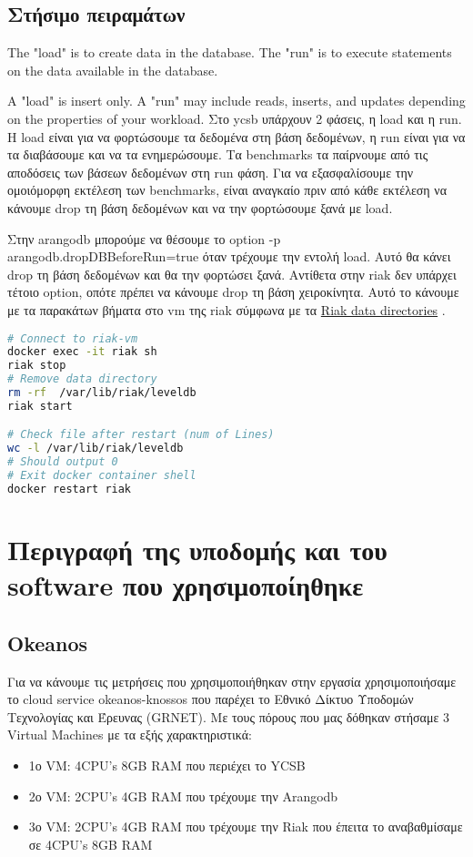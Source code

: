 \documentclass[conference]{IEEEtran}
\begin{document}
\subsection{Στήσιμο πειραμάτων}
The "load" is to create data in the database. The "run" is to execute statements on the data available in the database.

A "load" is insert only. A "run" may include reads, inserts, and updates depending on the properties of your workload.
Στο ycsb υπάρχουν 2 φάσεις, η load και η run. Η load είναι για να φορτώσουμε τα 
δεδομένα στη βάση δεδομένων, η run είναι για να τα διαβάσουμε και να τα 
ενημερώσουμε. Τα benchmarks τα παίρνουμε από τις αποδόσεις των βάσεων δεδομένων
στη run φάση.
Για να εξασφαλίσουμε την ομοιόμορφη εκτέλεση των benchmarks, είναι αναγκαίο πριν 
από κάθε εκτέλεση να κάνουμε drop τη βάση δεδομένων και να την φορτώσουμε ξανά με load.

Στην arangodb μπορούμε να θέσουμε το option -p arangodb.dropDBBeforeRun=true όταν τρέχουμε 
την εντολή load. Αυτό θα κάνει drop τη βάση δεδομένων και θα την φορτώσει ξανά.
Αντίθετα στην riak δεν υπάρχει τέτοιο option, οπότε πρέπει να κάνουμε drop τη βάση
χειροκίνητα. Αυτό το κάνουμε με τα παρακάτων βήματα στο vm της riak σύμφωνα με τα 
\href{https://docs.riak.com/riak/kv/2.1.4/using/cluster-operations/backing-up/#os-specific-directory-locations}{Riak data directories}
.
\begin{lstlisting}[language=bash
    ,    basicstyle=\small %or \tiny or \footnotesize etc.
]
# Connect to riak-vm
docker exec -it riak sh
riak stop
# Remove data directory
rm -rf 	/var/lib/riak/leveldb
riak start

# Check file after restart (num of Lines)
wc -l /var/lib/riak/leveldb
# Should output 0
# Exit docker container shell
docker restart riak
\end{lstlisting}


\section{Περιγραφή της υποδομής και του software που χρησιμοποίηθηκε}

\subsection{Okeanos}
Για να κάνουμε τις μετρήσεις που χρησιμοποιήθηκαν στην εργασία χρησιμοποιήσαμε το cloud service okeanos-knossos που παρέχει το Εθνικό Δίκτυο Υποδομών Τεχνολογίας και Έρευνας (GRNET). Mε τους πόρους που μας δόθηκαν στήσαμε 3 Virtual Machines με τα εξής χαρακτηριστικά:
\begin{itemize}

\item
1ο VM: 4CPU’s 8GB RAM που περιέχει το YCSB
\item
2ο VM: 2CPU’s 4GB RAM που τρέχουμε την Arangodb
\item
3ο VM: 2CPU’s 4GB RAM που τρέχουμε την Riak  που έπειτα το αναβαθμίσαμε σε 4CPU’s 8GB RAM

\end{itemize}
\end{document}
